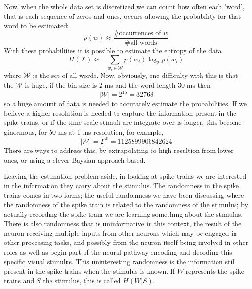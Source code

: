 \documentclass[11pt,a4paper]{scrartcl}
\begin{document}
Now, when the whole data set is discretized we can count how often
each 'word', that is each sequence of zeros and ones, occurs allowing
the probability for that word to be estimated:
\begin{equation}
p(w)\approx \frac{\#\mbox{occurrences of }w}{\#\mbox{all words}}
\end{equation}
With these probabilities it is possible to estimate the entropy of the
data
\begin{equation}
H(X)\approx -\sum_{w_i\in\mathcal{W}}p(w_i)\log_2{p(w_i)}
\end{equation}
where $\mathcal{W}$ is the set of all words. Now, obviously, one
difficulty with this is that the $\mathcal{W}$ is huge, if the bin size is 2 ms and the word length 30 ms then 
\begin{equation}
|\mathcal{W}|=2^{15}=32768
\end{equation}
so a huge amount of data is needed to accurately estimate the
probabilities. If we believe a higher resolution is needed to capture
the information present in the spike trains, or if the time scale
stimuli are integrate over is longer, this become ginormous, for 50 ms
at 1 ms resolution, for example,
\begin{equation}
|\mathcal{W}|=2^{50}=1125899906842624
\end{equation}
There are ways to address this, by extrapolating to high resultion
from lower ones, or using a clever Baysian approach based.

Leaving the estimation problem aside, in looking at spike trains we
are interested in the information they carry about the stimulus. The
randomness in the spike trains comes in two forms; the useful
randomness we have been discussing where the randomness of the spike
train is related to the randomness of the stimulus; by actually
recording the spike train we are learning something about the
stimulus. There is also randomness that is uninformative in this
context, the result of the neuron receiving multiple inputs from other
neurons which may be engaged in other processing tasks, and possibly
from the neuron itself being involved in other roles as well as begin
part of the neural pathway encoding and decoding this specific visual
stimulus. This uninteresting randomness is the information still
present in the spike trains when the stimulus is known. If $W$
represents the spike trains and $S$ the stimulus, this is called
$H(W|S)$.
\end{document}
